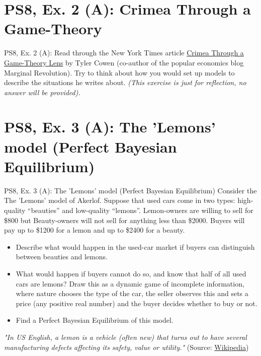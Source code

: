 \section{PS8, Ex. 2 (A): Crimea Through a Game-Theory }

\begin{frame}{PS8, Ex. 2 (A): }
    Read through the New York Times article \href{https://www.nytimes.com/2014/03/16/business/crimea-through-a-game-theory-lens.html}{Crimea Through a Game-Theory Lens} by Tyler Cowen (co-author of the popular economics blog Marginal Revolution). Try to think about how you would set up models to describe the situations he writes about. \textit{(This exercise is just for reflection, no answer will be provided).}
    \vfill\null
\end{frame}



\section{PS8, Ex. 3 (A): The 'Lemons' model (Perfect Bayesian Equilibrium)}

\begin{frame}{PS8, Ex. 3 (A): The 'Lemons' model (Perfect Bayesian Equilibrium)}
    Consider the The 'Lemons' model of Akerlof. Suppose that used cars come in two types: high-quality “beauties” and low-quality “lemons”. Lemon-owners are willing to sell for \$800 but Beauty-owners will not sell for anything less than \$2000. Buyers will pay up to \$1200 for a lemon and up to \$2400 for a beauty.
    \begin{itemize}
      \item[(a)] Describe what would happen in the used-car market if buyers can distinguish between beauties and lemons.
      \item[(b)] What would happen if buyers cannot do so, and know that half of all used cars are lemons? Draw this as a dynamic game of incomplete information, where nature chooses the type of the car, the seller observes this and sets a price (any positive real number) and the buyer decides whether to buy or not.
      \item[(c)] Find a Perfect Bayesian Equilibrium of this model.
    \end{itemize}
    \textit{"In US English, a lemon is a vehicle (often new) that turns out to have several manufacturing defects affecting its safety, value or utility."} (Source: \href{https://en.wikipedia.org/wiki/Lemon_(automobile)}{Wikipedia})
    \vfill\null
\end{frame}


